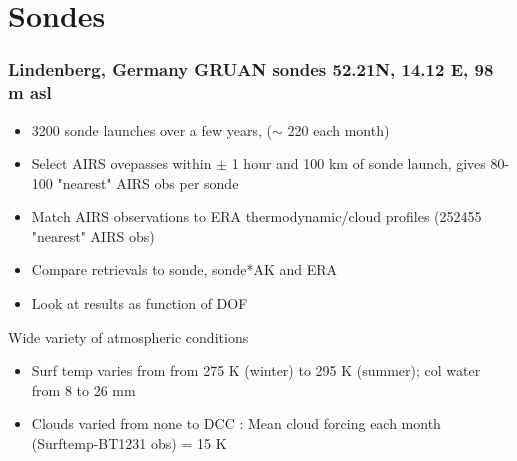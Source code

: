 \documentclass[10pt,t]{beamer}
\begin{document}
\section{Sondes}
\begin{frame}
  \frametitle{Lindenberg, Germany GRUAN sondes \newline 52.21N, 14.12 E, 98
    m asl}

  \begin{itemize}
  \item 3200 sonde launches over a few years, ($\sim$ 220 each month)
  \item Select AIRS ovepasses within $\pm$ 1 hour and 100 km of sonde
    launch, gives 80-100 "nearest" AIRS obs per sonde
  \item Match AIRS observations to ERA thermodynamic/cloud profiles (252455
    "nearest" AIRS obs)
  \item Compare retrievals to sonde, sonde*AK and ERA
  \item Look at results as function of DOF
  \end{itemize}

  \vspace{0.125in} Wide variety of atmospheric conditions
  \begin{itemize}
  \item Surf temp varies from from 275 K (winter) to 295 K (summer); col
    water from 8 to 26 mm
  \item Clouds varied from none to DCC : Mean cloud forcing each month
    (Surftemp-BT1231 obs) = 15 K
  \end{itemize}
\end{frame}
\end{document}
